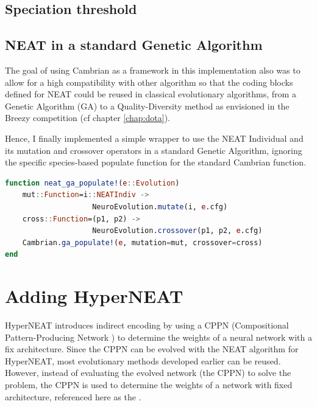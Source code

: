 \subsection{Speciation threshold}

\subsection{NEAT in a standard Genetic Algorithm}

The goal of using Cambrian as a framework in this implementation also was to allow for a high compatibility with other algorithm so that the coding blocks defined for NEAT could be reused in classical evolutionary algorithms, from a Genetic Algorithm (GA) to a Quality-Diversity method as envisioned in the Breezy competition (cf chapter \ref{chap:dota}). 

Hence, I finally implemented a simple wrapper to use the NEAT Individual and its mutation and crossover operators in a standard Genetic Algorithm, ignoring the specific species-based populate function for the standard Cambrian  function.

\begin{minipage}{\linewidth}
\begin{lstlisting}[language=Julia, caption=NEAT in a Genetic Algorithm (\href{https://github.com/TemplierPaul/NeuroEvolution.jl/blob/master/src/evolution.jl}{\color{blue}{Source}})]
function neat_ga_populate!(e::Evolution)
    mut::Function=i::NEATIndiv -> 
                    NeuroEvolution.mutate(i, e.cfg)
    cross::Function=(p1, p2) -> 
                    NeuroEvolution.crossover(p1, p2, e.cfg)
    Cambrian.ga_populate!(e, mutation=mut, crossover=cross)
end
\end{lstlisting}
\end{minipage}

\section{Adding HyperNEAT}
HyperNEAT \cite{HyperNEAT} introduces indirect encoding by using a CPPN (Compositional Pattern-Producing Network \cite{CPPN}) to determine the weights of a neural network with a fix architecture. Since the CPPN can be evolved with the NEAT algorithm for HyperNEAT, most evolutionary methods developed earlier can be reused. \\ 
However, instead of evaluating the evolved network (the CPPN) to solve the problem, the CPPN is used to determine the weights of a network with fixed architecture, referenced here as the . 

